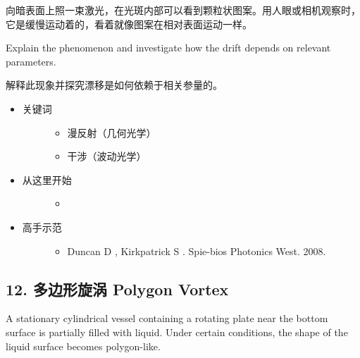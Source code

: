 \documentclass[a4paper,10pt,english]{sphinxmanual}
\begin{document}
向暗表面上照一束激光，在光斑内部可以看到颗粒状图案。用人眼或相机观察时，它是缓慢运动着的，看着就像图案在相对表面运动一样。

Explain the phenomenon and investigate how the drift depends on relevant parameters.

解释此现象并探究漂移是如何依赖于相关参量的。
\begin{itemize}
\item {} \begin{description}
\item[{关键词}] \leavevmode\begin{itemize}
\item {} 
漫反射（几何光学）

\item {} 
干涉（波动光学）

\end{itemize}

\end{description}

\item {} \begin{description}
\item[{从这里开始}] \leavevmode\begin{itemize}
\item {} 

\end{itemize}

\end{description}

\item {} \begin{description}
\item[{高手示范}] \leavevmode\begin{itemize}
\item {} 
Duncan D , Kirkpatrick S .  Spie-bios Photonics West. 2008.

\end{itemize}

\end{description}

\end{itemize}


\subsection{12. 多边形旋涡 Polygon Vortex}
\label{\detokenize{7. Appendix:polygon-vortex}}
A stationary cylindrical vessel containing a rotating plate near the bottom surface is partially filled with liquid. Under certain conditions, the shape of the liquid surface becomes polygon-like.
\end{document}
